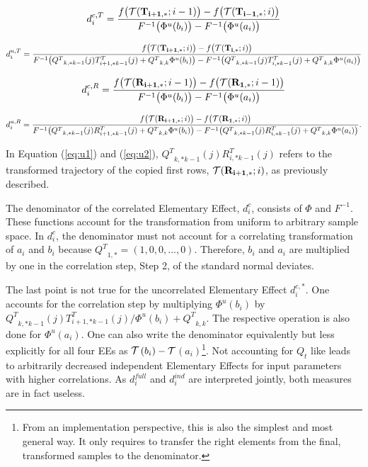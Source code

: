 \begin{align}
d_i^{c,T} = \frac{f\big(\mathcal{T}(\bold{T_{i+1,*}}; i-1)\big) - f\big(\mathcal{T}(\bold{T_{i-1,*}}; i)\big)}{F^{-1}\big(\Phi^u(b_i)\big) - F^{-1}\big( \Phi^u(a_i)\big)}
\end{align}

\begin{align} \label{eq:u1}
d_i^{u, T} = \frac{f\big(\mathcal{T}(\bold{T_{i+1,*}}; i)\big) - f\big(\mathcal{T}(\bold{T_{i,*}}; i)\big)}{F^{-1}\big({Q^T}_{k,*k-1}(j)T_{i+1,*k-1}^T(j) + {Q^T}_{k,k} \Phi^u(b_i)\big) - F^{-1}\big({Q^T}_{k,*k-1}(j)T_{i,*k-1}^T(j)+{Q^T}_{k,k} \Phi^u(a_i)\big)}
\end{align}

\begin{align}
d_i^{c, R} = \frac{f\big(\mathcal{T}(\bold{R_{i+1,*}}; i-1)\big) - f\big(\mathcal{T}(\bold{R_{1,*}}; i-1)\big)}{F^{-1}\big( \Phi^u(b_i)\big) - F^{-1}\big( \Phi^u(a_i)\big)}
\end{align}

\begin{align} \label{eq:u2}
d_i^{u, R} = \frac{f\big(\mathcal{T}(\bold{R_{i+1,*}}; i)\big) - f\big(\mathcal{T}(\bold{R_{1,*}}; i)\big)}{F^{-1}\big({Q^T}_{k,*k-1}(j)R_{i+1,*k-1}^T(j) + {Q^T}_{k,k} \Phi^u(b_i)\big) - F^{-1}\big({Q^T}_{k,*k-1}(j)R_{i,*k-1}^T(j)+{Q^T}_{k,k} \Phi^u(a_i)\big)}.
\end{align}

\noindent
In Equation (\ref{eq:u1}) and (\ref{eq:u2}), ${Q^T}_{k,*k-1}(j)R_{i,*k-1}^T(j)$ refers to the transformed trajectory of the copied first rows, $\mathcal{T}(\bold{R_{i+1,*}}; i)$, as previously described.

The denominator of the correlated Elementary Effect, $d_i^{c}$, consists of $\Phi$ and $F^{-1}$. These functions account for the transformation from uniform to arbitrary sample space. In $d_i^{c}$, the denominator must not account for a correlating transformation of $a_i$ and $b_i$ because ${Q^T}_{1,*} = (1, 0, 0, ..., 0)$.  Therefore, $b_i$ and $a_i$ are multiplied by one in the correlation step, Step 2, of the standard normal deviates.

The last point is not true for the uncorrelated Elementary Effect $d_i^{c,*}$. One accounts for the correlation step by multiplying $\Phi^u(b_i)$ by ${Q^T}_{k,*k-1}(j)T_{i+1,*k-1}^T(j)/\Phi^u(b_i)+{Q^T}_{k,k}$. The respective operation is also done for $\Phi^u(a_i)$. One can also write the denominator equivalently but less explicitly for all four EEs as $\cal{T}$$ (b_i) - \cal{T}$$ (a_i)$\footnote{From an implementation perspective, this is also the simplest and most general way. It only requires to transfer the right elements from the final, transformed samples to the denominator.}. Not accounting for $Q_t$ like \cite{ge2017extending} leads to arbitrarily decreased independent Elementary Effects for input parameters with higher correlations. As $d_i^{full}$ and $d_i^{ind}$ are interpreted jointly, both measures are in fact useless.

